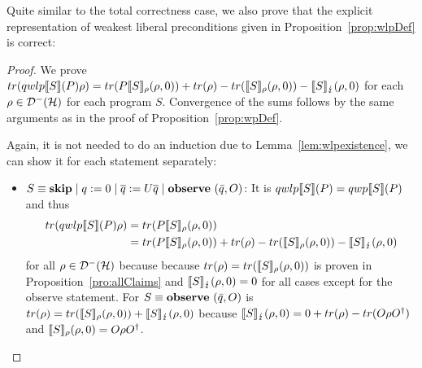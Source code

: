 \documentclass[a4paper,UKenglish,cleveref, autoref, thm-restate]{lipics-v2021}
\begin{document}
Quite similar to the total correctness case, we also prove that the explicit representation of weakest liberal preconditions given in Proposition~\ref{prop:wlpDef} is correct:
\begin{proof}
    We prove $tr(qwlp\llbracket S \rrbracket (P)\rho) = tr(P\llbracket S \rrbracket_{\rho}(\rho,0)) + tr(\rho)-tr(\llbracket S \rrbracket_{\rho}(\rho,0))- \llbracket S \rrbracket_{\lightning}(\rho,0)$ for each $\rho \in \mathcal{D}^- (\mathcal{H})$ for each program $S$. Convergence of the sums follows by the same arguments as in the proof of Proposition~\ref{prop:wpDef}.

    Again, it is not needed to do an induction due to Lemma~\ref{lem:wlpexistence}, we can show it for each statement separately:
    \begin{itemize}
        \item $S\equiv \mathbf{skip} \mid q:=0 \mid \overline{q}:= U\overline{q} \mid \mathbf{observe } \text{ }(\Bar{q},O)$: It is $qwlp\llbracket S \rrbracket (P) = qwp\llbracket S \rrbracket (P)$ and thus
        \begin{align*}
            tr(qwlp\llbracket S \rrbracket (P)\rho) &= tr(P\llbracket S \rrbracket_{\rho}(\rho,0))\\
            &= tr(P\llbracket S \rrbracket_{\rho}(\rho,0)) + tr(\rho)-tr(\llbracket S \rrbracket_{\rho}(\rho,0))- \llbracket S \rrbracket_{\lightning}(\rho,0)
        \end{align*}
        for all $\rho \in \mathcal{D}^- (\mathcal{H})$ because because $tr(\rho)=tr(\llbracket S \rrbracket_{\rho}(\rho,0))$ is proven in Proposition~\ref{pro:allClaims} and $\llbracket S \rrbracket_{\lightning}(\rho,0) = 0$ for all cases except for the observe statement. For $S \equiv \mathbf{observe } \text{ }(\Bar{q},O)$ is $tr(\rho)= tr(\llbracket S \rrbracket_{\rho}(\rho,0))+ \llbracket S \rrbracket_{\lightning}(\rho,0)$ because $\llbracket S \rrbracket_{\lightning}(\rho,0)=0+tr(\rho) - tr(O\rho O^\dagger)$ and $\llbracket S \rrbracket_{\rho}(\rho,0) = O\rho O^\dagger$.


\end{itemize}
\end{proof}
\end{document}
